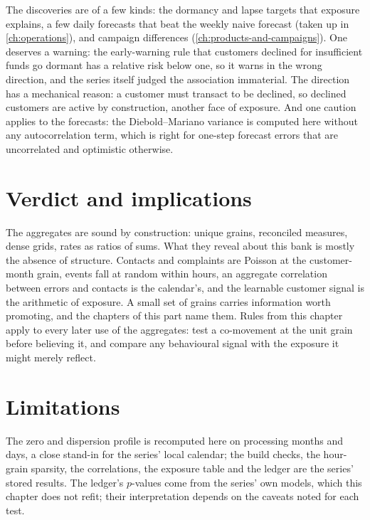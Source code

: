 



The discoveries are of a few kinds: the dormancy and lapse targets that exposure explains, a few daily forecasts that beat the
weekly naive forecast (taken up in \cref{ch:operations}), and campaign differences (\cref{ch:products-and-campaigns}). One
deserves a warning: the early-warning rule that customers declined for insufficient funds go dormant has a relative risk below one, so it warns in the wrong direction, and the series itself judged the association immaterial. The direction has a mechanical reason: a customer must transact to be declined, so declined customers are active by construction, another face of exposure. And one caution applies to the forecasts: the Diebold--Mariano variance is computed
here without any autocorrelation term, which is right for one-step forecast errors that are uncorrelated and optimistic
otherwise.

\section{Verdict and implications}\label{sec:ag2-verdict}

The aggregates are sound by construction: unique grains, reconciled measures, dense grids, rates as ratios of sums. What
they reveal about this bank is mostly the absence of structure. Contacts and complaints are Poisson at the customer-month
grain, events fall at random within hours, an aggregate correlation between errors and contacts is the calendar's, and the
learnable customer signal is the arithmetic of exposure. A small set of grains carries information worth promoting, and
the chapters of this part name them. Rules from this chapter apply to every later use of the aggregates: test a
co-movement at the unit grain before believing it, and compare any behavioural signal with the exposure it might merely
reflect.

\section{Limitations}\label{sec:ag2-limits}

The zero and dispersion profile is recomputed here on processing months and days, a close stand-in for the series' local
calendar; the build checks, the hour-grain sparsity, the correlations, the exposure table and the ledger are the series'
stored results. The ledger's $p$-values come from the series' own models, which this chapter does not refit; their
interpretation depends on the caveats noted for each test.
